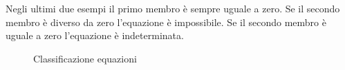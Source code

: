 Negli ultimi due esempi il primo membro è sempre uguale a zero. Se il secondo membro è diverso da zero l'equazione è impossibile. Se il secondo membro è uguale a zero l'equazione è indeterminata.
\begin{figure}
		\centering

	\caption[]{Classificazione equazioni}
	\label{fig:AlberoBinarioeqa1}
\end{figure}






%
